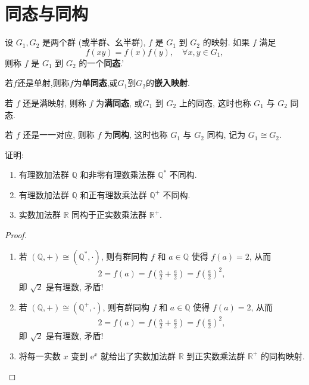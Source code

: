 \documentclass[../../main.tex]{subfiles}%
\begin{document}
\section{同态与同构}

\begin{definition}
设 \( G_1,G_2 \) 是两个群 (或半群、幺半群), \( f \) 是 \( G_1 \) 到 \( G_2 \) 的映射. 如果 \( f \) 满足
\[
f(xy) = f(x)f(y), \quad \forall x,y \in G_1,
\]
则称 \( f \) 是 \( G_1 \) 到 \( G_2 \) 的一个\textbf{同态}.'

若$f$还是单射,则称$f$为\textbf{单同态},或$G_1$到$G_2$的\textbf{嵌入映射}.

若 \( f \) 还是满映射, 则称 \( f \) 为\textbf{满同态}, 或\( G_1 \) 到 \( G_2 \) 上的同态, 这时也称 \( G_1 \) 与 \( G_2 \) 同态.

若 \( f \) 还是一一对应, 则称 \( f \) 为\textbf{同构}, 这时也称 \( G_1 \) 与 \( G_2 \) 同构, 记为 \( G_1 \cong G_2 \).
\end{definition}

\begin{example}
证明:
\begin{enumerate}[(1)]
\item 有理数加法群 $\mathbb{Q}$ 和非零有理数乘法群 $\mathbb{Q}^*$ 不同构.

\item 有理数加法群 $\mathbb{Q}$ 和正有理数乘法群 $\mathbb{Q}^+$ 不同构.

\item 实数加法群 $\mathbb{R}$ 同构于正实数乘法群 $\mathbb{R}^+$.
\end{enumerate}
\end{example}
\begin{proof}
\begin{enumerate}[(1)]
\item 若 $(\mathbb{Q},+)\cong (\mathbb{Q}^*,\cdot)$, 则有群同构 $f$ 和 $a\in \mathbb{Q}$ 使得 $f(a)=2$, 从而
\begin{align*}
2 = f(a) = f\left(\frac{a}{2} + \frac{a}{2}\right) = f\left(\frac{a}{2}\right)^2,
\end{align*}
即 $\sqrt{2}$ 是有理数, 矛盾!

\item 若 $(\mathbb{Q},+)\cong (\mathbb{Q}^+,\cdot)$, 则有群同构 $f$ 和 $a\in \mathbb{Q}$ 使得 $f(a)=2$, 从而
\begin{align*}
2 = f(a) = f\left(\frac{a}{2} + \frac{a}{2}\right) = f\left(\frac{a}{2}\right)^2,
\end{align*}
即 $\sqrt{2}$ 是有理数, 矛盾!

\item 将每一实数 $x$ 变到 $\mathrm{e}^x$ 就给出了实数加法群 $\mathbb{R}$ 到正实数乘法群 $\mathbb{R}^+$ 的同构映射.
\end{enumerate}

\end{proof}
\end{document}
